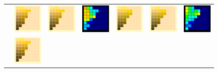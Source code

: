 \begin{figure}[t!]
{\begin{tabular}{ccccccc}
			&\includegraphics[width=.155\linewidth]{img/results_uplift_page11_originalFL11.png}
			&
			\includegraphics[width=.155\linewidth]{img/results_uplift_page11_sigmoidFL11.png}
			& 
			\includegraphics[width=.155\linewidth]{img/results_uplift_page11_diff_sigmoidFL11.png}
			&\quad
			\includegraphics[width=.155\linewidth]{img/results_uplift_page12_originalFL11.png}
			&
			\includegraphics[width=.155\linewidth]{img/results_uplift_page12_sigmoidFL11.png}
			&
			\includegraphics[width=.155\linewidth]{img/results_uplift_page12_diff_sigmoidFL11.png}
			\\ \raisebox{0.5cm}[0pt][0pt]{\parbox[c][0pt][c]{0cm}{\hspace{-1.5em}\\[20pt]}\par}
			&
			\includegraphics[width=.155\linewidth]{img/results_uplift_page11_originalFL11.png}

\end{tabular}}
\end{figure}
